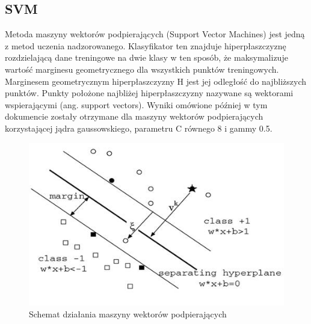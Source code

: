 \documentclass{article}
\begin{document}
\subsection{SVM}
Metoda maszyny wektorów podpierających (Support Vector Machines) jest jedną z metod uczenia nadzorowanego. Klasyfikator ten znajduje hiperpłaszczyznę rozdzielającą dane treningowe na dwie klasy w ten sposób, że maksymalizuje wartość marginesu geometrycznego dla wszystkich punktów treningowych. Marginesem geometrycznym hiperpłaszczyzny H jest jej odległość do najbliższych punktów. Punkty położone najbliżej hiperpłaszczyzny nazywane są wektorami wspierającymi (ang. support vectors). Wyniki omówione później w tym dokumencie zostały otrzymane dla maszyny wektorów podpierających korzystającej jądra gaussowskiego, parametru C równego 8 i gammy 0.5.
\begin{figure}[htp]
	\centering
	\includegraphics[width=1\textwidth]{Figures/svm.jpg}
	\caption{Schemat działania maszyny wektorów podpierających }
\end{figure}
\end{document}
